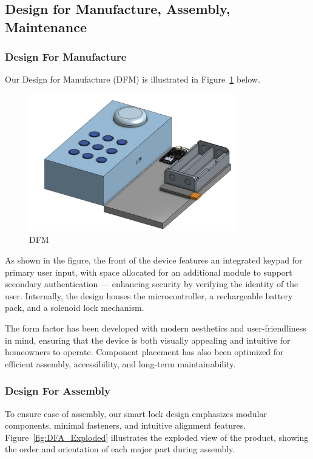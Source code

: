 \subsection{Design for Manufacture, Assembly, Maintenance} %
\subsubsection*{Design For Manufacture}
Our Design for Manufacture (DFM) is illustrated in Figure~\ref{fig:DFM} below.

\begin{figure}[!ht]
    \centering
    \includegraphics[width=0.80\textwidth]{img/DFM side view.png}
    \caption{DFM}
    \label{fig:DFM}
\end{figure}

As shown in the figure, the front of the device features an integrated keypad for primary user input, with space allocated for an additional module to support secondary authentication — enhancing security by verifying the identity of the user. Internally, the design houses the microcontroller, a rechargeable battery pack, and a solenoid lock mechanism.

The form factor has been developed with modern aesthetics and user-friendliness in mind, ensuring that the device is both visually appealing and intuitive for homeowners to operate. Component placement has also been optimized for efficient assembly, accessibility, and long-term maintainability.

\subsubsection*{Design For Assembly}
To ensure ease of assembly, our smart lock design emphasizes modular components, minimal fasteners, and intuitive alignment features. Figure~\ref{fig:DFA_Exploded} illustrates the exploded view of the product, showing the order and orientation of each major part during assembly.

